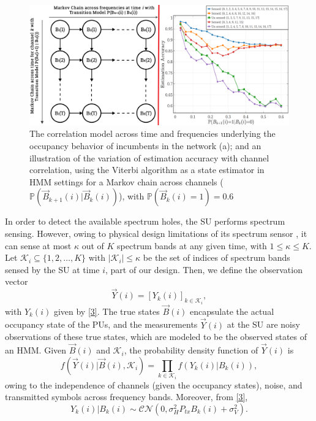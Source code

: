 \documentclass[10pt,twocolumn]{IEEEtran}
\begin{document}
\begin{figure} [t]
    \centering
    \includegraphics[width=0.9\linewidth]{System_Model_2.png}
    \caption{The correlation model across time and frequencies underlying the occupancy behavior of incumbents in the network (a); and an illustration of the variation of estimation accuracy with channel correlation, using the Viterbi algorithm as a state estimator in HMM settings for a Markov chain across channels ($\mathbb{P}(\vec{B}_{k{+}1}(i){|}\vec{B}_{k}(i))$), with $\mathbb{P}(\vec{B}_{k}(i){=}1){=}0.6$}
    \label{fig:1}
    \vspace{-6mm}
\end{figure}

In order to detect the available spectrum holes, the SU performs spectrum sensing. However, owing to physical design limitations of its spectrum sensor \cite{5990482}, it can sense at most $\kappa$ out of $K$ spectrum bands at any given time, with $1{\leq}\kappa{\leq}K$. Let $\mathcal K_{i}{\subseteq}\{1,2,\dots,K\}$ with $|\mathcal K_i|{\leq}\kappa$ be the set of indices of spectrum bands sensed by the SU at time $i$, part of our design.
Then, we define the observation vector
\begin{equation}\label{8}
    \vec{Y}(i) = [Y_k(i)]_{k {\in} \mathcal K_i},
\end{equation}
with $Y_k(i)$ given by \eqref{3}.
The true states $\vec{B}(i)$ encapsulate the actual occupancy state of the PUs, and the measurements $\vec{Y}(i)$ at the SU are noisy observations of these true states, which are modeled to be the observed states of an HMM. Given $\vec{B}(i)$ and $\mathcal K_i$, the probability density function of $\vec{Y}(i)$ is
\begin{equation}\label{9}
    f(\vec{Y}(i)|\vec{B}(i), \mathcal K_i) = \prod_{k \in \mathcal K_i} f(Y_k(i)|B_k(i)),
\end{equation}
owing to the independence of channels (given the occupancy states), noise, and transmitted symbols across frequency bands. Moreover, from \eqref{3},
\begin{equation}\label{10}
 Y_k(i)|B_k(i) \sim \mathcal{CN}(0, \sigma_H^2P_{tx}B_k(i) + \sigma_V^2).
\end{equation}
\end{document}
